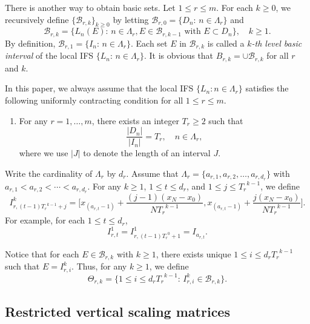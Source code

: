 \documentclass[11pt]{amsart}
\theoremstyle{definition}
\theoremstyle{remark}
\numberwithin{equation}{section}
\newcommand{\mB}{{\mathcal B}}
\begin{document}
There is another way to obtain basic sets. Let $ 1 \leq r \leq m $.
For each $k\geq 0$, we recursively define $\{\mB_{r,k}\}_{k\geq 0}$ by letting $\mB_{r,0}=\{D_n:\, n\in \Lambda_r\}$ and 
\[
  \mB_{r,k}=\big\{L_n(E):\,  n\in \Lambda_r,  E\in \mB_{r,k-1} \mbox{ with } E\subset D_n \big\}, \quad  k \geq 1.
\]
By definition, $\mB_{r,1}=\{I_n:\, n\in \Lambda_r\}$. Each set $E$ in $\mB_{r,k}$ is called a \emph{ $k$-th level basic interval} of the local IFS $\{L_n:\, n\in \Lambda_r\}$. It is obvious that $B_{r,k}=\cup \mB_{r,k}$ for all $r$ and $k$. 

In this paper, we always assume that the local IFS $\{L_n : n \in \Lambda_r\}$ satisfies the following uniformly contracting condition for all $1 \leq r \leq m$. 
\begin{enumerate}
	\item[(A4)] For any $r=1,\ldots,m$, there exists an integer $T_r\geq 2$ such that
	$$\frac{|D_n|}{|I_n|}=T_r, \quad  n \in \Lambda_r,$$ 
	where we use $|J|$ to denote the length of an interval $J$.
\end{enumerate}
Write the cardinality of $\Lambda_r$ by $d_r$. Assume that $\Lambda_r=\{ a_{r,1},a_{r,2}, \ldots ,a_{r,d_r} \}$ with
$a_{r,1}<a_{r,2}<\cdots< a_{r,d_r}$.
For any $k \geq 1 $, $1 \leq t \leq d_r$, and $1 \leq j \leq {T_r}^{k-1}$, we define 
\begin{equation}\label{eq:Iri-def}
   I_{r,(t-1){T_r}^{k-1}+j}^{k}=\Big[ x_{(a_{r,t}-1)}+\frac{(j-1)(x_N-x_0)}{N{T_r}^{k-1}}, x_{(a_{r,t}-1)}+\frac{j(x_N-x_0)}{N{T_r}^{k-1}}  \Big].
\end{equation}
For example, for each $1\leq t\leq d_r$,
\begin{equation}\label{eq:Irt-One}
	I_{r,t}^1=I_{r,(t-1){T_r}^0+1}^1=I_{a_{r,t}}.
\end{equation}




Notice that for each $E\in \mB_{r,k}$ with $k \geq 1$, there exists unique $1\leq i\leq d_r{T_r}^{k-1}$ such that $E=I_{r,i}^k$. Thus, for any $ k \geq 1$, we define
\[
	\Theta_{r,k}=\big\{ 1 \leq  i \leq d_r {T_r}^{k-1}: \,I_{r,i}^k \in \mB_{r,k}  \big\}.
\]



\subsection{Restricted vertical scaling matrices}
\end{document}

